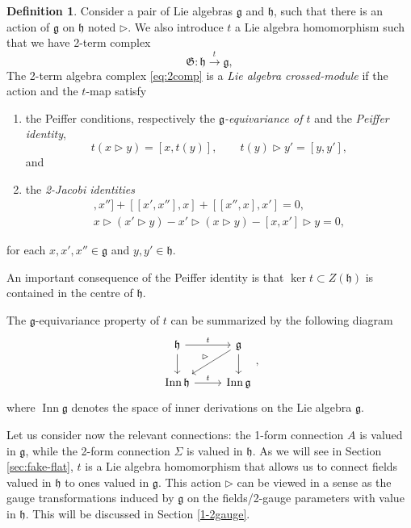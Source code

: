 \documentclass[onecolumn]{article}
\theoremstyle{theorem}
\theoremstyle{remark}
\theoremstyle{example}
\theoremstyle{definition}
\newtheorem{definition}{Definition}[section]
\numberwithin{equation}{section}
\def\ker{\operatorname{ker}}
\def\g{\mathfrak g}
\def\h{\mathfrak h}
\begin{document}
\begin{definition}
Consider a pair of Lie algebras $\mathfrak{g}$ and $\mathfrak{h}$,  such that there is an action of $\mathfrak{g}$ on $\mathfrak{h}$ noted $\rhd$. We also introduce $t$  a Lie algebra homomorphism  such that we have  2-term complex 
\begin{equation}
    \mathfrak{G}: \mathfrak{h}\xrightarrow{t}\mathfrak{g},\label{eq:2comp}
\end{equation}
{The} 2-term algebra complex  \eqref{eq:2comp} is a \textit{ Lie algebra crossed-module} if the action and the $t$-map satisfy 
\begin{enumerate}
    \item  the Peiffer conditions, respectively the \textit{$\g$-equivariance of $t$} and the \textit{Peiffer identity},
\begin{equation}
    t(x\rhd y) = [x,t(y)],\qquad t(y)\rhd y' = [y,y'],\nonumber
\end{equation}
and 
\item the \textit{2-Jacobi identities}
\begin{eqnarray}
    [[x,x'],x''] + [[x',x''],x] + [[x'',x],x'] =0,\nonumber \\
    x\rhd (x'\rhd y) - x'\rhd (x\rhd y) - [x,x']\rhd y = 0,\nonumber
\end{eqnarray}
\end{enumerate}
for each $x,x',x''\in\mathfrak{g}$ and $y,y'\in\mathfrak{h}$.
\end{definition}

 {An important} %
consequence of the Peiffer identity is that $\ker t\subset Z(\mathfrak{h})$ is contained in the centre of $\mathfrak{h}$.

The $\g$-equivariance property of $t$ can be summarized by the following diagram
\begin{equation}
\begin{tikzcd}
\mathfrak{h} \arrow[r, "t"] \arrow[d]                                    & \mathfrak{g} \arrow[d] \arrow[ld, "\rhd"']\\
\operatorname{Inn}\mathfrak{h} \arrow[r, "t"] & \operatorname{Inn}\mathfrak{g} 
\end{tikzcd},\label{equivdiag}
\end{equation} 
where $\operatorname{Inn}\g$ denotes the space of inner derivations on the Lie algebra $\g$.


Let us consider now the relevant connections: the 1-form connection $A$ is valued in $\g$, while the 2-form connection $\Sigma$ is valued in $\h$. As we will see in Section \ref{sec:fake-flat}, $t$ is a Lie algebra homomorphism that allows us to connect fields valued in $\h$ to ones valued in $\g$.  This action $\rhd$ can be viewed in a sense as the gauge transformations induced by $\mathfrak{g}$ on the fields/2-gauge parameters with value in $\mathfrak{h}$. This will be discussed in Section \ref{1-2gauge}. 
\end{document}
